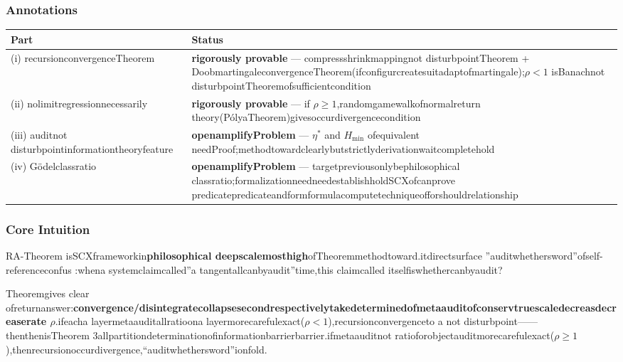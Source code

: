 \documentclass[
  12pt,
]{article}
\begin{document}
\subsubsection{Annotations}\label{ux6807ux6ce8-3}

\begin{longtable}[]{@{}
  >{\raggedright\arraybackslash}p{}
  >{\raggedright\arraybackslash}p{}@{}}
\toprule\noalign{}
\begin{minipage}[b]{\linewidth}\raggedright
Part
\end{minipage} & \begin{minipage}[b]{\linewidth}\raggedright
Status
\end{minipage} \\
\midrule\noalign{}
\endhead
\bottomrule\noalign{}
\endlastfoot
(i) recursionconvergenceTheorem & \textbf{rigorously provable} --- compressshrinkmappingnot disturbpointTheorem +
DoobmartingaleconvergenceTheorem(ifconfigurcreatesuitadaptofmartingale);\(\rho < 1\)
isBanachnot disturbpointTheoremofsufficientcondition \\
(ii) nolimitregressionnecessarily  & \textbf{rigorously provable} --- if
\(\rho \geq 1\),randomgamewalkofnormalreturn theory(PólyaTheorem)givesoccurdivergencecondition \\
(iii) auditnot disturbpointinformationtheoryfeature & \textbf{openamplifyProblem} --- \(\eta^*\) and
\(H_{\min}\) ofequivalent needProof;methodtowardclearlybutstrictlyderivationwaitcompletehold \\
(iv) Gödelclassratio & \textbf{openamplifyProblem} ---
targetpreviousonlybephilosophical classratio;formalizationneedneedestablishholdSCXofcanprove predicatepredicateandformformulacomputetechniqueofforshouldrelationship \\
\end{longtable}

\subsubsection{Core Intuition}\label{ux6838ux5fc3ux76f4ux89c9-3}

RA-Theorem
isSCXframeworkin\textbf{philosophical deepscalemosthigh}ofTheoremmethodtoward.itdirectsurface ''auditwhethersword''ofself-referenceconfus :whena  systemclaimcalled''a tangentallcanbyaudit''time,this claimcalled itselfiswhethercanbyaudit?

Theoremgives clear ofreturnanswer:\textbf{convergence/disintegratecollapsesecondrespectivelytakedeterminedofmetaauditofconservtruescaledecreasdecreaserate
\(\rho\)}.ifeacha layermetaauditallratioona layermorecarefulexact(\(\rho < 1\)),recursionconvergenceto a  not disturbpoint------thenthenisTheorem
3allpartitiondeterminationofinformationbarrierbarrier.ifmetaauditnot ratioforobjectauditmorecarefulexact(\(\rho \geq 1\)),thenrecursionoccurdivergence,``auditwhethersword''ionfold.
\end{document}
